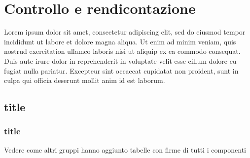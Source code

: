 \newpage
\section{Controllo e rendicontazione} \label{ControlloERendicontazione}

	Lorem ipsum dolor sit amet, consectetur adipiscing elit, sed do eiusmod tempor incididunt ut labore et dolore magna aliqua. Ut enim ad minim veniam, quis nostrud exercitation ullamco laboris nisi ut aliquip ex ea commodo consequat. Duis aute irure dolor in reprehenderit in voluptate velit esse cillum dolore eu fugiat nulla pariatur. Excepteur sint occaecat cupidatat non proident, sunt in culpa qui officia deserunt mollit anim id est laborum.

	\subsection{title}
		\subsubsection{title}
		
		
	Vedere come altri gruppi hanno aggiunto tabelle con firme di tutti i componenti